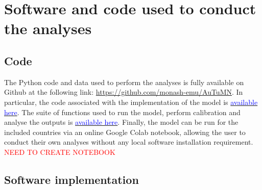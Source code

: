 \section{Software and code used to conduct the analyses}

\subsection{Code}
The Python code and data used to perform the analyses is fully available on Github at the following link:
\href{https://github.com/monash-emu/AuTuMN}{https://github.com/monash-emu/AuTuMN}. In particular, the code 
associated with the implementation of the model is \href{https://github.com/monash-emu/AuTuMN/blob/c6a9a3f6c81e39808dfb5383a342de2079ac8f1b/autumn/models/sm_covid2/model.py#L178-L537}{\textcolor{blue}{available here}}.
The suite of functions used to run the model, perform calibration and analyse the outputs is \href{https://github.com/monash-emu/AuTuMN/blob/master/autumn/projects/sm_covid2/common_school/runner_tools.py}{\textcolor{blue}{available here}}.
Finally, the model can be run for the included countries via an online Google Colab notebook, allowing the user to conduct their own analyses without
any local software installation requirement. \textcolor{red}{NEED TO CREATE NOTEBOOK} 

\subsection{Software implementation}
